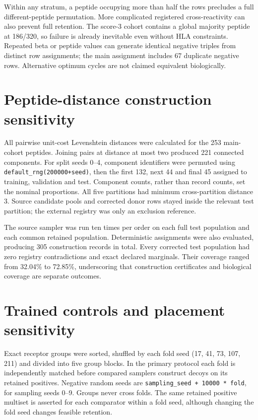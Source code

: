 \documentclass[11pt,a4paper]{article}
\begin{document}
Within any stratum, a peptide occupying more than half the rows precludes a full different-peptide permutation. More complicated registered cross-reactivity can also prevent full retention. The score-3 cohort contains a global majority peptide at 186/320, so failure is already inevitable even without HLA constraints. Repeated beta or peptide values can generate identical negative triples from distinct row assignments; the main assignment includes 67 duplicate negative rows. Alternative optimum cycles are not claimed equivalent biologically.

\section{Peptide-distance construction sensitivity}
All pairwise unit-cost Levenshtein distances were calculated for the 253 main-cohort peptides. Joining pairs at distance at most two produced 221 connected components. For split seeds 0--4, component identifiers were permuted using \texttt{default\_rng(200000+seed)}, then the first 132, next 44 and final 45 assigned to training, validation and test. Component counts, rather than record counts, set the nominal proportions. All five partitions had minimum cross-partition distance 3. Source candidate pools and corrected donor rows stayed inside the relevant test partition; the external registry was only an exclusion reference.
\begin{table}[h]\centering\small
\caption{Distance-separated partition sizes and test retention. No predictive model was fitted in this analysis.}\label{tab:splits}

\end{table}
The source sampler was run ten times per order on each full test population and each common retained population. Deterministic assignments were also evaluated, producing 305 construction records in total. Every corrected test population had zero registry contradictions and exact declared marginals. Their coverage ranged from 32.04\% to 72.85\%, underscoring that construction certificates and biological coverage are separate outcomes.

\section{Trained controls and placement sensitivity}
Exact receptor groups were sorted, shuffled by each fold seed (17, 41, 73, 107, 211) and divided into five group blocks. In the primary protocol each fold is independently matched before compared samplers construct decoys on its retained positives. Negative random seeds are \texttt{sampling\_seed + 10000 * fold}, for sampling seeds 0--9. Groups never cross folds. The same retained positive multiset is asserted for each comparator within a fold seed, although changing the fold seed changes feasible retention.
\end{document}
